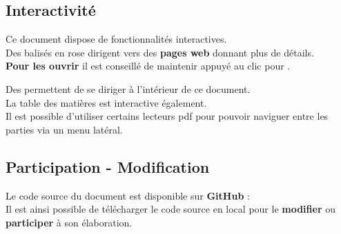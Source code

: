 \subsection*{Interactivité}

Ce document dispose de fonctionnalités interactives. \\
Des  balisés en {\color{monrose}rose} dirigent vers des \textbf{pages web} donnant plus de détails. \\
\textbf{Pour les ouvrir} il est conseillé de maintenir  appuyé au clic pour . 

Des  permettent de se diriger à l'intérieur de ce document. \\

La table des matières est interactive également. \\

Il est possible d'utiliser certains lecteurs pdf pour pouvoir naviguer entre les parties via un menu latéral. 

\subsection*{Participation - Modification}

Le code source du document est disponible sur \textbf{GitHub} : \\
Il est ainsi possible de télécharger le code source en local pour le \textbf{modifier} ou \textbf{participer} à son élaboration. 
